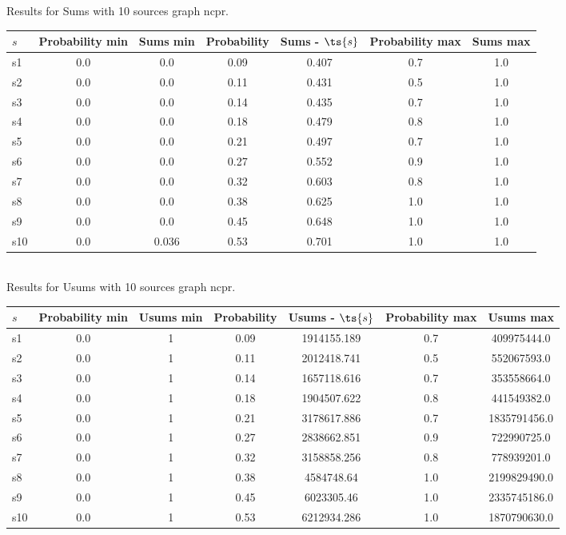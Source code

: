 \documentclass{article}
\begin{document}
\noindent Results for Sums with 10 sources graph ncpr.

\noindent\begin{tabular}{|l|c|c|c|c|c|c|}
\hline
$s$& Probability min & Sums min & Probability & Sums - $\ts{s}$ & Probability max & Sums max\\
\hline
s1 &0.0 & 0.0 & 0.09 & 0.407 & 0.7 & 1.0\\
\hline
s2 &0.0 & 0.0 & 0.11 & 0.431 & 0.5 & 1.0\\
\hline
s3 &0.0 & 0.0 & 0.14 & 0.435 & 0.7 & 1.0\\
\hline
s4 &0.0 & 0.0 & 0.18 & 0.479 & 0.8 & 1.0\\
\hline
s5 &0.0 & 0.0 & 0.21 & 0.497 & 0.7 & 1.0\\
\hline
s6 &0.0 & 0.0 & 0.27 & 0.552 & 0.9 & 1.0\\
\hline
s7 &0.0 & 0.0 & 0.32 & 0.603 & 0.8 & 1.0\\
\hline
s8 &0.0 & 0.0 & 0.38 & 0.625 & 1.0 & 1.0\\
\hline
s9 &0.0 & 0.0 & 0.45 & 0.648 & 1.0 & 1.0\\
\hline
s10 &0.0 & 0.036 & 0.53 & 0.701 & 1.0 & 1.0\\
\hline
\end{tabular}\\

\noindent Results for Usums with 10 sources graph ncpr.

\noindent\begin{tabular}{|l|c|c|c|c|c|c|}
\hline
$s$& Probability min & Usums min & Probability & Usums - $\ts{s}$ & Probability max & Usums max\\
\hline
s1 &0.0 & 1 & 0.09 & 1914155.189 & 0.7 & 409975444.0\\
\hline
s2 &0.0 & 1 & 0.11 & 2012418.741 & 0.5 & 552067593.0\\
\hline
s3 &0.0 & 1 & 0.14 & 1657118.616 & 0.7 & 353558664.0\\
\hline
s4 &0.0 & 1 & 0.18 & 1904507.622 & 0.8 & 441549382.0\\
\hline
s5 &0.0 & 1 & 0.21 & 3178617.886 & 0.7 & 1835791456.0\\
\hline
s6 &0.0 & 1 & 0.27 & 2838662.851 & 0.9 & 722990725.0\\
\hline
s7 &0.0 & 1 & 0.32 & 3158858.256 & 0.8 & 778939201.0\\
\hline
s8 &0.0 & 1 & 0.38 & 4584748.64 & 1.0 & 2199829490.0\\
\hline
s9 &0.0 & 1 & 0.45 & 6023305.46 & 1.0 & 2335745186.0\\
\hline
s10 &0.0 & 1 & 0.53 & 6212934.286 & 1.0 & 1870790630.0\\
\hline
\end{tabular}\\
\end{document}
